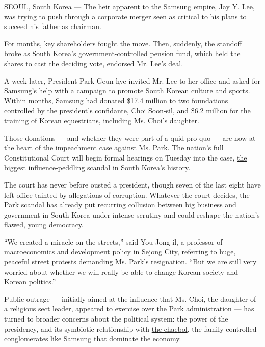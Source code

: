 SEOUL, South Korea --- The heir apparent to the Samsung empire, Jay Y.
Lee, was trying to push through a corporate merger seen as critical to
his plans to succeed his father as chairman.

For months, key shareholders
\href{https://www.nytimes.com/2015/07/05/business/samsung-merger-plan-called-unfair-to-some-investors.html?_r=0}{fought
the move}. Then, suddenly, the standoff broke as South Korea's
government-controlled pension fund, which held the shares to cast the
deciding vote, endorsed Mr. Lee's deal.

A week later, President Park Geun-hye invited Mr. Lee to her office and
asked for Samsung's help with a campaign to promote South Korean culture
and sports. Within months, Samsung had donated \$17.4 million to two
foundations controlled by the president's confidante, Choi Soon-sil, and
\$6.2 million for the training of Korean equestrians, including
\href{http://www.nytimes.com/2017/01/02/world/asia/south-korea-scandal-choi-soon-sil-daughter.html}{Ms.
Choi's daughter}.

Those donations --- and whether they were part of a quid pro quo --- are
now at the heart of the impeachment case against Ms. Park. The nation's
full Constitutional Court will begin formal hearings on Tuesday into the
case, \href{http://nyti.ms/2dQpNWq}{the biggest influence-peddling
scandal} in South Korea's history.

The court has never before ousted a president, though seven of the last
eight have left office tainted by allegations of corruption. Whatever
the court decides, the Park scandal has already put recurring collusion
between big business and government in South Korea under intense
scrutiny and could reshape the nation's flawed, young democracy.

``We created a miracle on the streets,'' said You Jong-il, a professor
of macroeconomics and development policy in Sejong City, referring to
\href{http://www.nytimes.com/2016/11/13/world/asia/korea-park-geun-hye-protests.html}{huge,
peaceful street protests} demanding Ms. Park's resignation. ``But we are
still very worried about whether we will really be able to change Korean
society and Korean politics.''

Public outrage --- initially aimed at the influence that Ms. Choi, the
daughter of a religious sect leader, appeared to exercise over the Park
administration --- has turned to broader concerns about the political
system: the power of the presidency, and its symbiotic relationship with
\href{http://www.nytimes.com/2011/09/14/business/global/south-korean-chaebol-under-increasing-pressure.html}{the
chaebol}, the family-controlled conglomerates like Samsung that dominate
the economy.

